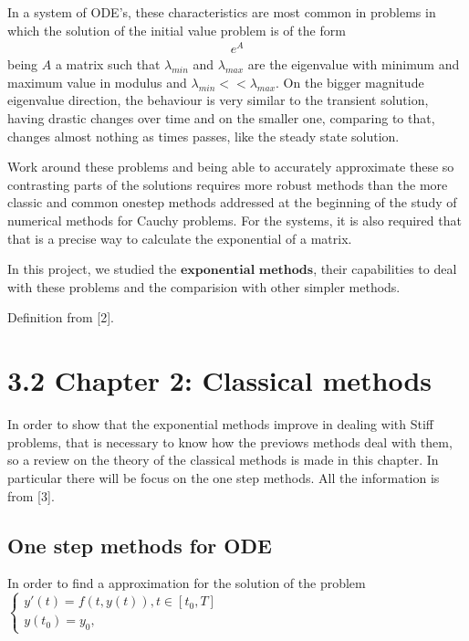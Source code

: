 \documentclass[letterpaper,10pt,english]{jupyterBook}
\begin{document}
\sphinxAtStartPar
In a system of ODE’s, these characteristics are most common in problems in which the solution of the initial value problem is of the form
\begin{equation*}
\begin{split}
    e^{A}
\end{split}
\end{equation*}
\sphinxAtStartPar
being \(A\) a matrix such that \(\lambda_{min}\) and \(\lambda_{max}\) are the eigenvalue with minimum and maximum value in modulus and \(\lambda_{min} << \lambda_{max}\). On the bigger magnitude eigenvalue direction, the behaviour is very similar to the transient solution, having drastic changes over time and on the smaller one, comparing to that, changes almost nothing as times passes, like the steady state solution.

\sphinxAtStartPar
Work around these problems and being able to accurately approximate these so contrasting parts of the solutions requires more robust methods than the more classic and common one\sphinxhyphen{}step methods addressed at the beginning of the study of numerical methods for Cauchy problems. For the systems, it is also required that that is a precise way to calculate the exponential of a matrix.

\sphinxAtStartPar
In this project, we studied the \(\textbf{exponential methods}\), their capabilities to deal with these problems and the comparision with other simpler methods.

\sphinxAtStartPar
Definition from {[}2{]}.

\sphinxstepscope


\section{3.2 Chapter 2: Classical methods}
\label{\detokenize{cap2:chapter-2-classical-methods}}\label{\detokenize{cap2::doc}}
\sphinxAtStartPar
In order to show that the exponential methods improve in dealing with Stiff problems, that is necessary to know how the previows methods deal with them, so a review on the theory of the classical methods is made in this chapter. In particular there will be focus on the one step methods. All the information is from {[}3{]}.


\subsection{One step methods for ODE}
\label{\detokenize{cap2:one-step-methods-for-ode}}
\sphinxAtStartPar
In order to find a approximation for the solution of the problem
\(\begin{cases}
y'(t) = f(t, y(t)), t \in [t_0,T] \\
y(t_0)=y_0 \text{,}
\end{cases}\)
\end{document}

